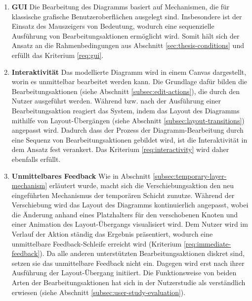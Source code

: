\begin{enumerate}[label={K.\arabic*}]

\item
\label{eval:gui}
\textbf{GUI}
Die Bearbeitung des Diagramms basiert auf Mechanismen, die für klassische grafische Benutzeroberflächen ausgelegt sind. Insbesondere ist der Einsatz des Mauszeigers von Bedeutung, wodurch eine sequenzielle Ausführung von Bearbeitungsaktionen ermöglicht wird. Somit hält sich der Ansatz an die Rahmenbedingungen aus Abschnitt \ref{sec:thesis-conditions} und erfüllt das Kriterium \ref{req:gui}.

\item
\label{eval:interactivity}
\textbf{Interaktivität}
Das modellierte Diagramm wird in einem Canvas dargestellt, worin es unmittelbar bearbeitet werden kann. Die Grundlage dafür bilden die Bearbeitungsaktionen (siehe Abschnitt \ref{subsec:edit-actions}), die durch den Nutzer ausgeführt werden. Während bzw. nach der Ausführung einer Bearbeitungsaktion reagiert das System, indem das Layout des Diagramms mithilfe von Layout-Übergängen (siehe Abschnitt \ref{subsec:layout-transitions}) angepasst wird. Dadurch dass der Prozess der Diagramm-Bearbeitung durch eine Sequenz von Bearbeitungsaktionen gebildet wird, ist die Interaktivität in dem Ansatz fest verankert. Das Kriterium \ref{req:interactivity} wird daher ebenfalls erfüllt.

\item
\label{eval:immediate-feedback}
\textbf{Unmittelbares Feedback}
Wie in Abschnitt \ref{subsec:temporary-layer-mechanism} erläutert wurde, macht sich die Verschiebungsaktion den neu eingeführten Mechanismus der temporären Schicht zunutze. Während der Verschiebung wird das Layout des Diagramms kontinuierlich angepasst, wobei die Änderung anhand eines Platzhalters für den verschobenen Knoten und einer Animation des Layout-Übergangs visualisiert wird. Dem Nutzer wird im Verlauf der Aktion ständig das Ergebnis präsentiert, wodurch eine unmittelbare Feedback-Schleife erreicht wird (Kriterium \ref{req:immediate-feedback}). Da alle anderen unterstützten Bearbeitungsaktionen diskret sind, setzen sie das unmittelbare Feedback nicht ein. Dagegen wird erst nach ihrer Ausführung der Layout-Übergang initiiert. Die Funktionsweise von beiden Arten der Bearbeitungsaktionen hat sich in der Nutzerstudie als verständlich erwiesen (siehe Abschnitt \ref{subsec:user-study-evaluation}).


\end{enumerate}

